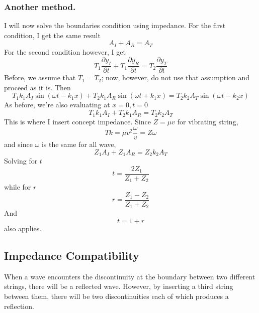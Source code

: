 \documentclass[../../../main.tex]{subfiles}
\begin{document}
\subsubsection{Another method.} I will now solve the boundaries condition using impedance. For the first condition, I get the same result
\begin{equation*}
    A_I+A_R=A_T
\end{equation*}
For the second condition however, I get 
\begin{equation*}
    T_1\frac{\partial y_I}{\partial t}+T_1\frac{\partial y_R}{\partial t}=T_2\frac{\partial y_T}{\partial t}
\end{equation*}
Before, we assume that $T_1=T_2$; now, however, do not use that assumption and proceed as it is. Then 
\begin{equation*}
    T_1k_1A_I \sin(\omega t - k_1x)+ T_2k_1A_R \sin(\omega t + k_1x) =  T_2k_2A_T \sin(\omega t - k_2x)
\end{equation*}
As before, we're also evaluating at $x=0, t=0$
\begin{equation*}
    T_1k_1A_I + T_2k_1A_R  =  T_2k_2A_T
\end{equation*}
This is where I insert concept impedance. Since $Z=\mu v$ for vibrating string, 
\begin{equation*}
    Tk=\mu v^2\frac{\omega}{v}=Z\omega
\end{equation*}
and since $\omega$ is the same for all wave,
\begin{equation*}
    Z_1A_I +Z_1A_R  =  Z_2k_2A_T
\end{equation*}
Solving for $t$
\begin{equation*}
    t=\frac{2Z_1}{Z_1+Z_2}
\end{equation*}
while for $r$
\begin{equation*}
    r =\frac{Z_1-Z_2}{Z_1+Z_2}
\end{equation*}
And 
\begin{equation*}
    t=1+r
\end{equation*}
also applies.

\subsection{Impedance Compatibility}

When a wave encounters the discontinuity at the boundary between two different strings, there will be a reﬂected wave. However, by inserting a third string between them, there will be two discontinuities each of which produces a reﬂection. 
\end{document}
